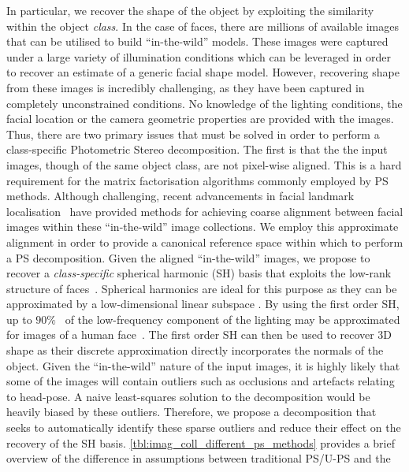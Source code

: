 In particular, we recover the shape of the object by exploiting the
similarity within the object \textit{class}. 
In the case of faces, there are millions of
available images that can be utilised to build ``in-the-wild'' models. These images
were captured under a large variety of illumination conditions which can be
leveraged in order to recover an estimate of a generic facial shape model.
However, recovering shape from these images is incredibly challenging, as they have been
captured in completely unconstrained conditions. No knowledge of the lighting
conditions, the facial location or the camera geometric properties are provided
with the images. Thus, there are two primary issues that must be solved in
order to perform a class-specific Photometric Stereo decomposition. The first
is that the the input images, though of the same object class, are not
pixel-wise aligned. This is a hard requirement for the matrix factorisation
algorithms commonly employed by PS methods. Although challenging, recent
advancements in facial landmark localisation~\cite{cootes2001active} have
provided methods for achieving coarse alignment between facial images within
these ``in-the-wild'' image collections. We employ this approximate alignment
in order to provide a canonical reference space within which to perform
a PS decomposition. Given the aligned ``in-the-wild'' images, we propose to
recover a \textit{class-specific} spherical harmonic (SH)
basis that exploits the low-rank structure of
faces~\cite{georghiades2001fromfew,Basri:2003ie}. Spherical harmonics are ideal for
this purpose as they can be approximated by a low-dimensional linear subspace
\cite{Basri:2003ie,ramamoorthi2001relationship}.
By using the first order SH, up to $90\%$~\cite{yuille1999determining} of
the low-frequency component of the lighting may be approximated for images
of a human face~\cite{Basri:2003ie,%
basri2007photometric,yuille1999determining}. The first order SH
can then be used to recover 3D shape as their discrete approximation directly
incorporates the normals of the object. Given the ``in-the-wild'' nature of
the input images, it is highly likely that some of the images will contain
outliers such as occlusions and artefacts relating to head-pose. A naive
least-squares solution to the decomposition would be heavily biased
by these outliers. Therefore, we propose a decomposition that seeks to
automatically identify these sparse outliers and reduce their effect on
the recovery of the SH basis.
\cref{tbl:imag_coll_different_ps_methods} provides a brief
overview of the difference in assumptions between traditional PS/U-PS and the
